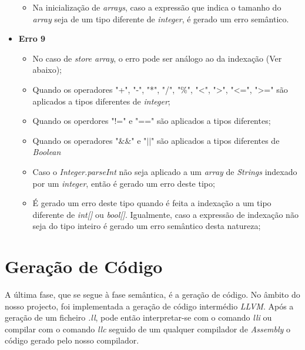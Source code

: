 \documentclass[11pt,a4paper]{article}
\begin{document}
\begin{itemize}
\begin{itemize}
        \item Na inicialização de \textit{arrays}, caso a expressão que indica o tamanho do \textit{array} seja de um tipo diferente de \textit{integer}, é gerado um erro semântico.
    \end{itemize}
    
    
    \item \textbf{Erro 9}
    
    \begin{itemize}
    
        \item No caso de \textit{store array}, o erro pode ser análogo ao da indexação (Ver abaixo);
        
        \item Quando os operadores "+", "-", "*", "/", "\%", "<", ">", "<=", ">=" são aplicados a tipos diferentes de \textit{integer};
        
        \item Quando os operdores "!=" e "==" são aplicados a tipos diferentes;
         
        \item Quando os operadores "$\&\&$" e "$||$" são aplicados a tipos diferentes de \textit{Boolean} 
        
        \item Caso o \textit{Integer.parseInt} não seja aplicado a um \textit{array} de \textit{Strings} indexado por um \emph{integer}, então é gerado um erro deste tipo;
        
        \item É gerado um erro deste tipo quando é feita a indexação a um tipo diferente de \textit{int[]} ou \textit{bool[]}. Igualmente, caso a expressão de indexação não seja do tipo inteiro é gerado um erro semântico desta natureza;
    \end{itemize}
    
\end{itemize}

\section{Geração de Código}

A última fase, que se segue à fase semântica, é a geração de código. No âmbito do nosso projecto, foi implementada a geração de código intermédio \textit{LLVM}. Após a geração de um ficheiro \textit{.ll}, pode então interpretar-se com o comando \textit{lli} ou compilar com o comando \textit{llc} seguido de um qualquer compilador de \textit{Assembly} o código gerado pelo nosso compilador.
\end{document}
